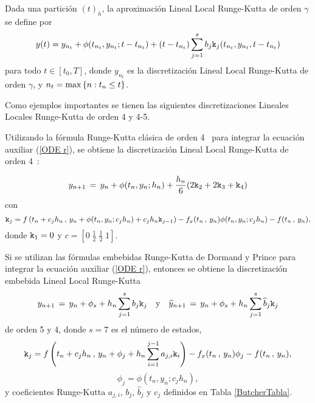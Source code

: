 \begin{definition}
	\label{definition HOLLA} \cite{Jimenez13} Dada una partición $(t)_{h}$, la aproximación Lineal Local Runge-Kutta de orden $\gamma$ se define por 
	\begin{equation*}
	y(t)=y_{n_{t}}+\phi(t_{n_{t}},y_{n_{t}};t-t_{n_{t}})+(t-t_{n_{t}})%
	\sum_{j=1}^{s}b_{j}\kt_{j}(t_{n_{t}},y_{n_{t}},t-t_{n_{t}}) %
	\end{equation*}
	para todo $t\in[t_{0},T]$, donde $y_{n_{t}}$ es la discretización Lineal Local Runge-Kutta de orden $\gamma$, y $n_{t}=\max\left\{ n:t_{n}\leq t \right\}$.
\end{definition}

Como ejemplos importantes se tienen las siguientes discretizaciones Lineales Locales Runge-Kutta de orden 4 y 4-5.

Utilizando la fórmula Runge-Kutta clásica de orden 4~\cite{hairer1993solving} para integrar la ecuación auxiliar (\ref{ODE r}), se obtiene la discretización Lineal Local Runge-Kutta de orden 4~\cite{Jimenez13}:

\begin{equation}
    y_{n+1}\,=\,y_n+\phi(t_n,y_n;h_n)+\frac{h_n}{6}(2\mathtt{k}_2+2\mathtt{k}_3+\mathtt{k}_4)
    \label{LL-scheme-4}
\end{equation}
con
    \[ \mathtt{k}_j = f\left( t_n+c_jh_n\, , \, y_n+\phi(t_n,y_n;c_jh_n)+c_jh_n\mathtt{k}_{j-1} \right)
- f_x(t_n\, , \, y_n)\phi(t_n,y_n;c_jh_n) - f(t_n\, ,\, y_n) ,\]
donde $\mathtt{k}_1=0$ y $c = \left[ 0 \; \frac{1}{2} \; \frac{1}{2} \; 1  \right]$.

Si se utilizan las fórmulas embebidas Runge-Kutta de Dormand y Prince para integrar la ecuación auxiliar (\ref{ODE r}), entonces se obtiene la discretización embebida Lineal Local Runge-Kutta~\cite{Jimenez14AMC}
\begin{equation}
y_{n+1}\,=\,y_n+\phi_s+h_n \sum_{j=1}^{s}b_j \mathtt{k}_j \quad \text{y} \quad
\widehat{y}_{n+1}\,=\, y_n+\phi_s+h_n \sum_{j=1}^{s}\widehat{b}_j \mathtt{k}_j
\label{LLDP-scheme-dp}
\end{equation}
de orden 5 y 4, donde $s = 7$ es el número de estados,
\[ \mathtt{k}_j = f\left( t_n+c_jh_n\, , \, y_n+\phi_j+h_n \sum_{i=1}^{j-1}a_{j,i}\mathtt{k}_i \right)  
- f_x(t_n\, , \, y_n)\phi_j - f(t_n\, ,\, y_n),\]
\[ \phi _j = \phi \left( t_{n},y_{n};c_jh_{n}\right), \]
y coeficientes Runge-Kutta $a_{j,i}$, $b_j$, $\hat{b}_j$ y $c_j$ definidos en Tabla \ref{ButcherTabla}.



